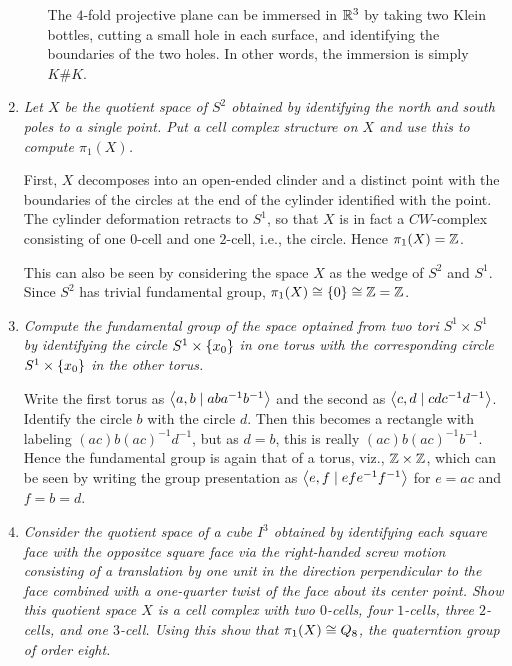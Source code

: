 \documentclass[10pt]{article}
\begin{document}
\begin{enumerate}
\begin{enumerate}
The $4$-fold projective plane can be immersed in $\mathbb{R}^3$ by taking two Klein bottles, cutting a small hole in each surface, and identifying the boundaries of the two holes.  In other words, the immersion is simply $K \# K$.

\end{enumerate}

\item \emph{Let $X$ be the quotient space of $S^2$ obtained by identifying the north and south poles to a single point.  Put a cell complex structure on $X$ and use this to compute $\pi_1(X)$.}

First, $X$ decomposes into an open-ended clinder and a distinct point with the boundaries of the circles at the end of the cylinder identified with the point.  The cylinder deformation retracts to $S^1$, so that $X$ is in fact a $CW$-complex consisting of one $0$-cell and one $2$-cell, i.e., the circle.  Hence $\pi_1(X) = \mathbb{Z}$.

This can also be seen by considering the space $X$ as the wedge of $S^2$ and $S^1$.  Since $S^2$ has trivial fundamental group, $\pi_1(X) \cong \left\{ 0 \right\} \cong \mathbb{Z} = \mathbb{Z}$.

\item \emph{Compute the fundamental group of the space optained from two tori $S^1 \times S^1$ by identifying the circle $S^1 \times \left\{ x_0 \right\}$ in one torus with the corresponding circle $S^1 \times \left\{ x_0 \right\}$ in the other torus.}

Write the first torus as $\left\langle a,b \mid aba^{-1}b^{-1} \right\rangle$ and the second as $\left\langle c,d \mid cdc^{-1}d^{-1} \right\rangle$.  Identify the circle $b$ with the circle $d$.  Then this becomes a rectangle with labeling $(ac)b(ac)^{-1}d^{-1}$, but as $d = b$, this is really $(ac)b(ac)^{-1}b^{-1}$.  Hence the fundamental group is again that of a torus, viz., $\mathbb{Z} \times \mathbb{Z}$, which can be seen by writing the group presentation as $\left\langle e,f \mid efe^{-1}f^{-1} \right\rangle$ for $e = ac$ and $f = b = d$.

\item \emph{Consider the quotient space of a cube $I^3$ obtained by identifying each square face with the oppositce square face via the right-handed screw motion consisting of a translation by one unit in the direction perpendicular to the face combined with a one-quarter twist of the face about its center point.  Show this quotient space $X$ is a cell complex with two $0$-cells, four $1$-cells, three $2$-cells, and one $3$-cell.  Using this show that $\pi_1(X) \cong Q_8$, the quaterntion group of order eight.}


\end{enumerate}
\end{document}
